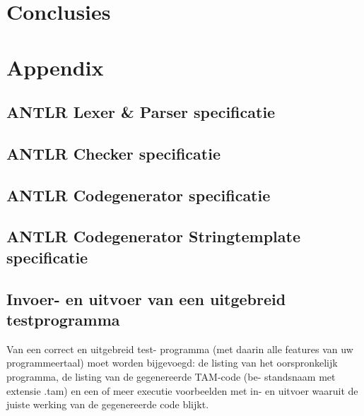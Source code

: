 \documentclass[]{article}
\begin{document}
\newpage
\section{Conclusies}



\newpage
\section{Appendix}

\subsection{ANTLR Lexer \& Parser specificatie}



\newpage
\subsection{ANTLR Checker specificatie}


\newpage
\subsection{ANTLR Codegenerator specificatie}


\begin{landscape}
\newpage
\subsection{ANTLR Codegenerator Stringtemplate specificatie}

\end{landscape}

\newpage
\subsection{Invoer- en uitvoer van een uitgebreid testprogramma}
Van een correct en uitgebreid test-
programma (met daarin alle features van uw programmeertaal) moet worden bijgevoegd: de
listing van het oorspronkelijk programma, de listing van de gegenereerde TAM-code (be-
standsnaam met extensie .tam) en een of meer executie voorbeelden met in- en uitvoer
waaruit de juiste werking van de gegenereerde code blijkt.
\end{document}
